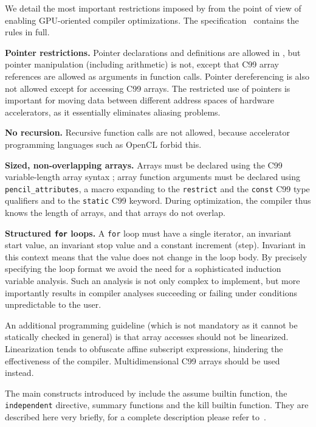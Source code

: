 \documentclass{llncs}
\begin{document}
We detail the most important restrictions imposed by \pencil from the point of 
view of enabling GPU-oriented compiler optimizations.  The \pencil
specification~\cite{pencil} contains the rules in full.

\smallskip\noindent\textbf{Pointer restrictions.}
  Pointer declarations and definitions are allowed in \pencil{}, but
  pointer manipulation (including arithmetic) is not, except that  C99
  array references are allowed as arguments in function calls.
  Pointer dereferencing is also not
  allowed except for accessing C99 arrays.  The restricted use of
  pointers is important for moving data between different address
  spaces of hardware accelerators, as it essentially eliminates aliasing
  problems.

\smallskip\noindent\textbf{No recursion.} 
  Recursive function calls are not allowed, because accelerator programming 
  languages such as OpenCL forbid this.

\smallskip\noindent\textbf{Sized, non-overlapping arrays.}
  Arrays must be declared using the C99 variable-length array
  syntax \cite{c99}; array function arguments must be declared using
  \lstinline!pencil_attributes!, a macro expanding to the
  \lstinline!restrict! and the \lstinline!const! C99 type qualifiers
  and to the \lstinline!static! C99 keyword.  During optimization,
  the \pencil compiler thus knows the length of arrays, and that arrays
  do not overlap.

\smallskip\noindent\textbf{Structured \lstinline!for! loops.} A \pencil
  \lstinline!for! loop must have a single iterator, an
  invariant start value, an invariant stop value and a
  constant increment (step).  Invariant in this context means that the
  value does not change in the loop body. By precisely specifying
  the loop format we avoid the need for a sophisticated induction
  variable analysis.  Such an analysis is not only complex to
  implement, but more importantly results in compiler analyses
  succeeding or failing under conditions unpredictable to the user.

\smallskip
An additional programming guideline (which is not mandatory as it cannot be 
statically checked in general)
is that array accesses should not be linearized.  Linearization tends to
obfuscate affine subscript expressions, hindering the effectiveness of
the \pencil compiler.
Multidimensional C99 arrays should be used instead.

The main constructs introduced by \pencil include the
assume builtin function, the
\lstinline!independent! directive, summary functions and
the kill builtin function.
They are described here very briefly, for a complete
description please refer to~\cite{pencil,pencil_pact,pencil_wolfhpc}.
\end{document}
